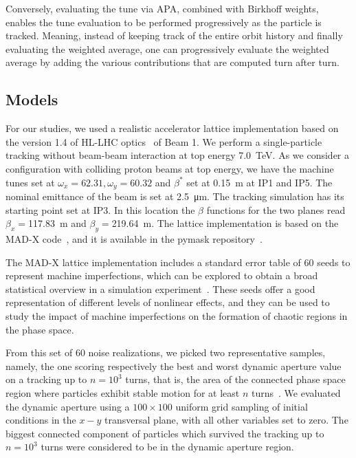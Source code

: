 Conversely, evaluating the tune via APA, combined with Birkhoff weights, enables the tune evaluation to be performed progressively as the particle is tracked. Meaning, instead of keeping track of the entire orbit history and finally evaluating the weighted average, one can progressively evaluate the weighted average by adding the various contributions that are computed turn after turn.

\subsection{Models} \label{sec:model}
%
For our studies, we used a realistic accelerator lattice implementation based on the version 1.4 of HL-LHC optics~\cite{} of Beam 1. We perform a single-particle tracking without beam-beam interaction at top energy \SI{7.0}{TeV}. As we consider a configuration with colliding proton beams at top energy, we have the machine tunes set at $\omega_x=62.31, \omega_y=60.32$ and $\beta^\ast$ set at \SI{0.15}{\meter} at IP1 and IP5. The nominal emittance of the beam is set at \SI{2.5}{\micro \meter}. The tracking simulation has its starting point set at IP3. In this location the $\beta$ functions for the two planes read $\beta_x=$\SI{117.83}{\meter} and $\beta_y=$\SI{219.64}{\meter}. The lattice implementation is based on the MAD-X code~\cite{}, and it is available in the pymask repository~\cite{}.

The MAD-X lattice implementation includes a standard error table of 60 seeds to represent machine imperfections, which can be explored to obtain a broad statistical overview in a simulation experiment~\cite{}. These seeds offer a good representation of different levels of nonlinear effects, and they can be used to study the impact of machine imperfections on the formation of chaotic regions in the phase space.

From this set of 60 noise realizations, we picked two representative samples, namely, the one scoring respectively the best and worst dynamic aperture value on a tracking up to $n=10^3$ turns, that is, the area of the connected phase space region where particles exhibit stable motion for at least $n$ turns~\cite{}. We evaluated the dynamic aperture using a $100\times100$ uniform grid sampling of initial conditions in the $x-y$ transversal plane, with all other variables set to zero. The biggest connected component of particles which survived the tracking up to $n=10^3$ turns were considered to be in the dynamic aperture region.


